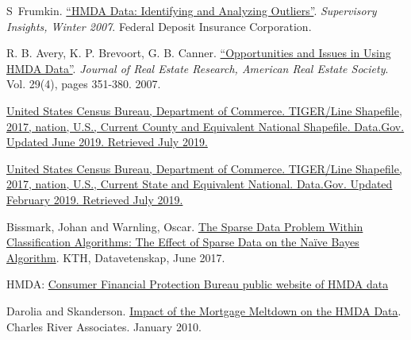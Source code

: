 \documentclass[conference,compsoc]{IEEEtran}
\begin{document}
\begin{thebibliography}{1}

S~Frumkin. \href{https://www.fdic.gov/regulations/examinations/supervisory/insights/siwin07/siwinter07-article4.pdf}{``HMDA Data: Identifying and Analyzing Outliers''}. \textit{Supervisory Insights, Winter 2007}.  Federal Deposit Insurance Corporation. 


R. B. Avery, K. P. Brevoort, G. B. Canner. \href{https://ideas.repec.org/a/jre/issued/v29n42007p351-380.html
}{``Opportunities and Issues in Using HMDA Data''}. \textit{Journal of Real Estate Research, American Real Estate Society}. Vol. 29(4), pages 351-380. 2007.

\href{ https://catalog.data.gov/dataset/tiger-line-shapefile-2017-nation-u-s-current-county-and-equivalent-national-shapefile}{United States Census Bureau, Department of Commerce. TIGER/Line Shapefile, 2017, nation, U.S., Current County and Equivalent National Shapefile. Data.Gov. Updated June 2019. Retrieved July 2019.}

\href{https://catalog.data.gov/dataset/tiger-line-shapefile-2017-nation-u-s-current-state-and-equivalent-national  }{United States Census Bureau, Department of Commerce. TIGER/Line Shapefile, 2017, nation, U.S., Current State and Equivalent National. Data.Gov. Updated February 2019. Retrieved July 2019. }


Bissmark, Johan and Warnling, Oscar. \href{http://www.diva-portal.se/smash/get/diva2:1111045/FULLTEXT01.pdf}{The Sparse Data Problem Within Classification Algorithms: The Effect of Sparse Data on the Naïve Bayes Algorithm}. KTH, Datavetenskap, June 2017.


HMDA: \href{https://www.consumerfinance.gov/data-research/hmda/historic-data/}{Consumer Financial Protection Bureau public website of HMDA data}


Darolia and Skanderson.  \href{https://www.crai.com/sites/default/files/publications/impact-of-the-mortgage-meltdown-on-the-hmda-data.pdf}{Impact of the Mortgage Meltdown on the HMDA Data}. Charles River Associates. January 2010.


\end{thebibliography}




\end{document}
